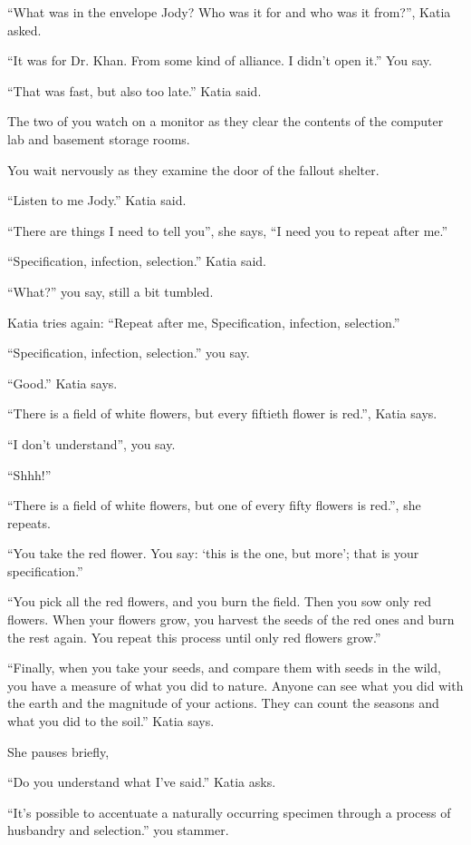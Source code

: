 \documentclass[17pt, twoside, a5paper, openright, extrafontsizes]{memoir}
\begin{document}
``What was in the envelope Jody? Who was it for and who was it from?'',
Katia asked.

``It was for Dr. Khan. From some kind of alliance. I didn't open it.''
You say.

``That was fast, but also too late.'' Katia said.

The two of you watch on a monitor as they clear the contents of the
computer lab and basement storage rooms.

You wait nervously as they examine the door of the fallout shelter.

``Listen to me Jody.'' Katia said.

``There are things I need to tell you'', she says, ``I need you to
repeat after me.''

``Specification, infection, selection.'' Katia said.

``What?'' you say, still a bit tumbled.

Katia tries again: ``Repeat after me, Specification, infection,
selection.''

``Specification, infection, selection.'' you say.

``Good.'' Katia says.

``There is a field of white flowers, but every fiftieth flower is
red.'', Katia says.

``I don't understand'', you say.

``Shhh!''

``There is a field of white flowers, but one of every fifty flowers is
red.'', she repeats.

``You take the red flower. You say: `this is the one, but more'; that is
your specification.''

``You pick all the red flowers, and you burn the field. Then you sow
only red flowers. When your flowers grow, you harvest the seeds of the
red ones and burn the rest again. You repeat this process until only red
flowers grow.''

``Finally, when you take your seeds, and compare them with seeds in the
wild, you have a measure of what you did to nature. Anyone can see what
you did with the earth and the magnitude of your actions. They can count
the seasons and what you did to the soil.'' Katia says.

She pauses briefly,

``Do you understand what I've said.'' Katia asks.

``It's possible to accentuate a naturally occurring specimen through a
process of husbandry and selection.'' you stammer.
\end{document}
